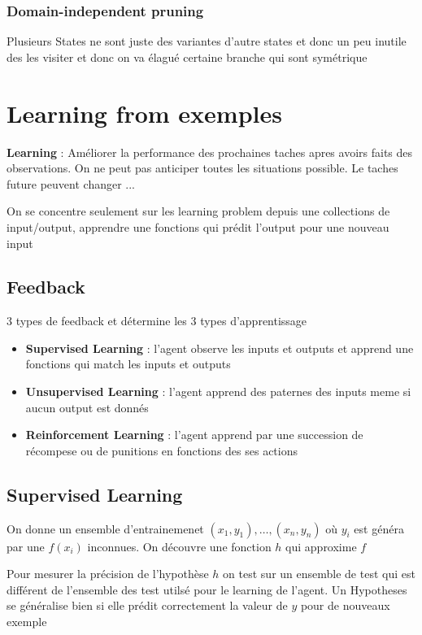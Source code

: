 \documentclass[12pt]{article}
\begin{document}
		\subsubsection{Domain-independent pruning}
		Plusieurs States ne sont juste des variantes d'autre states et donc un peu inutile des les visiter et donc on va élagué certaine branche qui sont symétrique
			
		
			
\section{Learning from exemples}
	\textbf{Learning} : Améliorer la performance des prochaines taches apres avoirs faits des observations. On ne peut pas anticiper toutes les situations possible. Le taches future peuvent changer ...
	
	On se concentre seulement sur les learning problem depuis une collections de input/output, apprendre une fonctions qui prédit l'output pour une nouveau input
	
	\subsection{Feedback}
		3 types de feedback et détermine les 3 types d'apprentissage
		\begin{itemize}
			\item \textbf{Supervised Learning} : l'agent observe les inputs et outputs et apprend une fonctions qui match les inputs et outputs
			\item \textbf{Unsupervised Learning} : l'agent apprend des paternes des inputs meme si aucun output est donnés
			\item \textbf{Reinforcement Learning} : l'agent apprend par une succession de récompese ou de punitions en fonctions des ses actions
			
		\end{itemize}
		
	\subsection{Supervised Learning}
		On donne un ensemble d'entrainemenet $(x_1,y_1), \dots , (x_n, y_n)$
			 où $y_i$ est généra par une $f(x_i)$ inconnues. On découvre une fonction $h$ qui approxime $f$
			
			Pour mesurer la précision de l'hypothèse $h$ on test sur un ensemble de test qui est différent de l'ensemble des test utilsé pour le learning de l'agent.
			Un Hypotheses se généralise bien si elle prédit correctement la valeur de $y$ pour de nouveaux exemple
\end{document}
